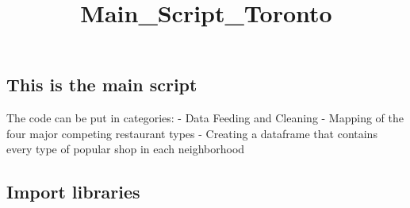 \documentclass[11pt]{article}
\title{Main\_Script\_Toronto}
\begin{document}
    
    
    \maketitle
    
    

    
    \subsection{This is the main script}\label{this-is-the-main-script}

The code can be put in categories: - Data Feeding and Cleaning - Mapping
of the four major competing restaurant types - Creating a dataframe that
contains every type of popular shop in each neighborhood

    \subsection{Import libraries}\label{import-libraries}
\end{document}
